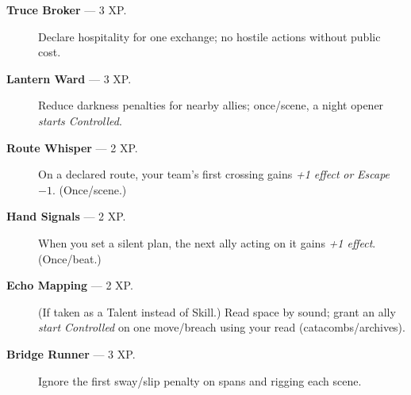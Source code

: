 \documentclass[11pt]{article}
\begin{document}
\begin{description}
  \item[\textbf{Truce Broker} — 3 XP.] Declare hospitality for one exchange; no hostile actions without public cost.
  \item[\textbf{Lantern Ward} — 3 XP.] Reduce darkness penalties for nearby allies; once/scene, a night opener \emph{starts Controlled}.
  \item[\textbf{Route Whisper} — 2 XP.] On a declared route, your team’s first crossing gains \emph{+1 effect} \emph{or} \emph{Escape $-1$}. (Once/scene.)
  \item[\textbf{Hand Signals} — 2 XP.] When you set a silent plan, the next ally acting on it gains \emph{+1 effect}. (Once/beat.)
  \item[\textbf{Echo Mapping} — 2 XP.] (If taken as a Talent instead of Skill.) Read space by sound; grant an ally \emph{start Controlled} on one move/breach using your read (catacombs/archives).
  \item[\textbf{Bridge Runner} — 3 XP.] Ignore the first sway/slip penalty on spans and rigging each scene.
\end{description}
\end{document}
